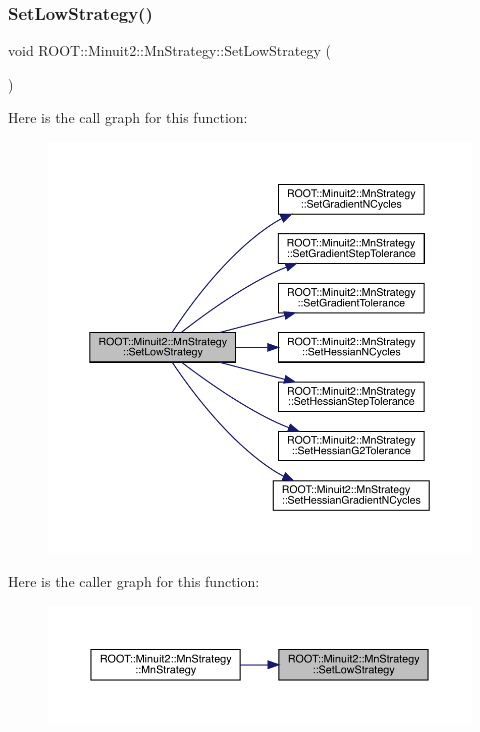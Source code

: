\subsubsection{\texorpdfstring{SetLowStrategy()}{SetLowStrategy()}\hspace{0.1cm}{\footnotesize\ttfamily [2/3]}}
{\footnotesize\ttfamily void R\+O\+O\+T\+::\+Minuit2\+::\+Mn\+Strategy\+::\+Set\+Low\+Strategy (\begin{DoxyParamCaption}{ }\end{DoxyParamCaption})}

Here is the call graph for this function\+:
\nopagebreak
\begin{figure}[H]
\begin{center}
\leavevmode
\includegraphics[width=350pt]{da/de4/classROOT_1_1Minuit2_1_1MnStrategy_a24671e2ae8a1224583adfcb3fb73ad55_cgraph}
\end{center}
\end{figure}
Here is the caller graph for this function\+:
\nopagebreak
\begin{figure}[H]
\begin{center}
\leavevmode
\includegraphics[width=350pt]{da/de4/classROOT_1_1Minuit2_1_1MnStrategy_a24671e2ae8a1224583adfcb3fb73ad55_icgraph}
\end{center}
\end{figure}
\mbox{\label{classROOT_1_1Minuit2_1_1MnStrategy_a24671e2ae8a1224583adfcb3fb73ad55}} 
